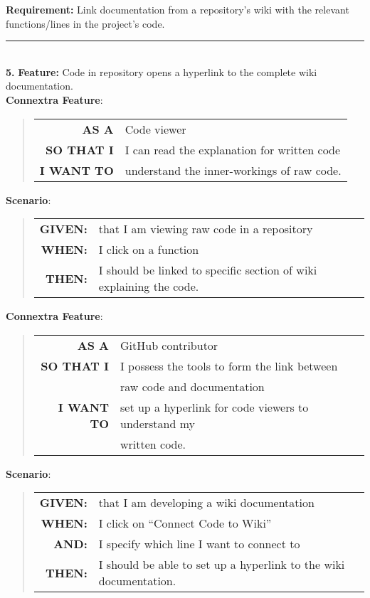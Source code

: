\documentclass[12pt]{article}
\newcommand{\Requirement}[1] {
   \noindent \textbf{Requirement:} #1
}
\newcommand{\Feature}[1]{ 
   \noindent \textbf{Feature:} #1
}
\newcommand{\GivenSc} {
	\noindent \textbf{GIVEN:}
	}
\newcommand{\WhenSc} {
	\noindent \textbf{WHEN:}
	}
\newcommand{\AndSc} {
	\noindent \textbf{AND:}
	}
\newcommand{\ThenSc} {
	\noindent \textbf{THEN:}
	}
\begin{document}
\pagebreak
\begin{framed}
\Requirement{Link documentation from a repository's wiki with the relevant functions/lines in the project's code.}\\[0.2cm]

\hrule~\\

\noindent  \textbf{5.} \Feature{Code in repository opens a hyperlink to the complete wiki documentation.}\\[0.2cm]

\noindent \textbf{Connextra Feature}:
\begin{quote}
\begin{tabular}{rl}
\textbf{AS A}      & Code viewer\\
\textbf{SO THAT I} & I can read the explanation for written code\\
\textbf{I WANT TO} & understand the inner-workings of raw code.
\end{tabular}
\end{quote}


\noindent \textbf{Scenario}:
\begin{quote}
\begin{tabular}{rl}
\GivenSc & that I am viewing raw code in a repository\\
\WhenSc & I click on a function\\
\ThenSc & I should be linked to specific section of wiki explaining the code. 
\end{tabular}
\end{quote}


\noindent \textbf{Connextra Feature}:
\begin{quote}
\begin{tabular}{rl}
\textbf{AS A}      & \textsf{GitHub} contributor\\
\textbf{SO THAT I} & I possess the tools to form the link between \\
                   & raw code and documentation \\
\textbf{I WANT TO} & set up a hyperlink for code viewers to understand my\\
                   &  written code.
\end{tabular}
\end{quote}

\noindent \textbf{Scenario}:
\begin{quote}
\begin{tabular}{rl}
\GivenSc & that I am developing a wiki documentation\\
\WhenSc & I click on ``Connect Code to Wiki''\\
\AndSc & I specify which line I want to connect to\\
\ThenSc & I should be able to set up a hyperlink to the wiki documentation.
\end{tabular}
\end{quote}


\end{framed}
\end{document}
